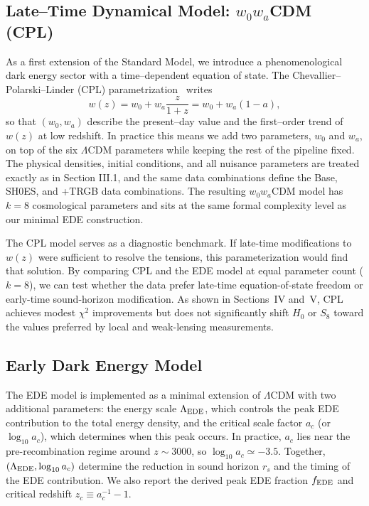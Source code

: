 \documentclass[a4paper,11pt]{article}
\begin{document}
\subsection{Late--Time Dynamical Model: $w_0 w_a$CDM (CPL)}
\label{sec:cpl}

As a first extension of the Standard Model, we introduce a phenomenological dark energy sector with a time--dependent equation of state. The Chevallier--Polarski--Linder (CPL) parametrization~\cite{Chevallier_Polarski,Linder_wz} writes
\begin{equation}
w(z) = w_0 + w_a \frac{z}{1+z} = w_0 + w_a(1-a),
\end{equation}
so that $(w_0, w_a)$ describe the present--day value and the first--order trend of $w(z)$ at low redshift. In practice this means we add two parameters, $w_0$ and $w_a$, on top of the six $\Lambda$CDM parameters while keeping the rest of the pipeline fixed. The physical densities, initial conditions, and all nuisance parameters are treated exactly as in Section III.1, and the same data combinations define the Base, SH0ES, and +TRGB data combinations. The resulting $w_0 w_a$CDM model has $k = 8$ cosmological parameters and sits at the same formal complexity level as our minimal EDE construction.

The CPL model serves as a diagnostic benchmark. If late-time modifications to $w(z)$ were sufficient to resolve the tensions, this parameterization would find that solution. By comparing CPL and the EDE model at equal parameter count ($k = 8$), we can test whether the data prefer late-time equation-of-state freedom or early-time sound-horizon modification. As shown in Sections~IV and~V, CPL achieves modest $\chi^2$ improvements but does not significantly shift $H_0$ or $S_8$ toward the values preferred by local and weak-lensing measurements.


\subsection{Early Dark Energy Model}
\label{sec:ede}

The EDE model is implemented as a minimal extension of $\Lambda$CDM with two additional parameters: the energy scale $\Lambda_{\rm EDE}$, which controls the peak EDE contribution to the total energy density, and the critical scale factor $a_c$ (or $\log_{10}a_c$), which determines when this peak occurs. In practice, $a_c$ lies near the pre-recombination regime around $z \sim 3000$, so $\log_{10}a_c \simeq -3.5$. Together, $(\Lambda_{\rm EDE}, \log_{10}a_c)$ determine the reduction in sound horizon $r_s$ and the timing of the EDE contribution. We also report the derived peak EDE fraction $f_{\rm EDE}$ and critical redshift $z_c \equiv a_c^{-1} - 1$.
\end{document}
